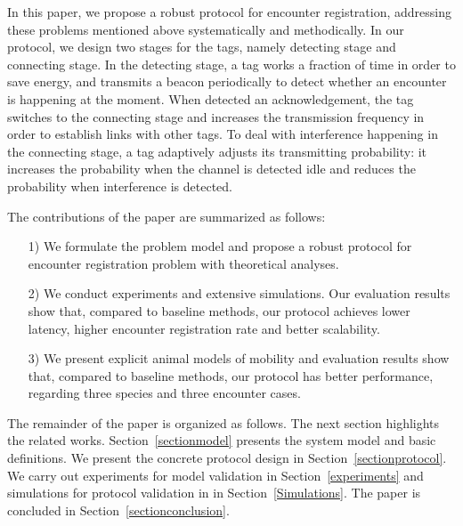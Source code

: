 

In this paper, we propose a robust protocol for encounter registration, 
addressing these problems mentioned above systematically and
methodically. In our protocol, we design two stages for the tags, 
namely detecting stage and connecting stage.
In the detecting stage, a tag works a fraction of time in order to save energy,
and transmits a beacon periodically to detect whether an encounter is happening at the moment.
When detected an acknowledgement, the tag switches to the connecting stage and increases the 
transmission frequency in order to establish links with other tags. To deal with interference 
happening in the connecting stage,
a tag adaptively adjusts its transmitting probability: it increases the probability when 
the channel is detected idle and reduces the probability when interference is detected.  


The contributions of the paper are summarized as follows:
\begin{itemize}
\item[1)] We formulate the problem model and propose a robust protocol for encounter registration problem 
with theoretical analyses. 
\item[2)] We conduct experiments and extensive simulations. Our evaluation results show that, 
compared to baseline methods, our protocol achieves lower latency, higher encounter 
registration rate and better scalability.
\item[3)] We present explicit animal models of mobility and evaluation results show that,
compared to baseline methods, our protocol has better performance, regarding three species
and three encounter cases.
\end{itemize}

The remainder of the paper is organized as follows. 
The next section highlights the related works.
Section~\ref{sectionmodel} presents the system model and basic definitions.
We present the concrete protocol design
in Section~\ref{sectionprotocol}. 
We carry out experiments for model validation in Section~\ref{experiments}
and simulations for protocol validation in in Section~\ref{Simulations}.
The paper is concluded in Section~\ref{sectionconclusion}.


